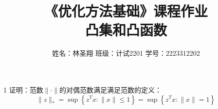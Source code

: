 \documentclass{article}
\newenvironment{problem_cn}[2][问题]{\begin{trivlist}
\item[\hskip \labelsep {\bfseries #1}\hskip \labelsep {\bfseries #2.}]}{\end{trivlist}}
\begin{document}

\title{《优化方法基础》课程作业\\凸集和凸函数}  %
\author{姓名：林圣翔 \quad 班级：计试2201 \quad 学号：2223312202}  %

\maketitle

\begin{problem_cn}{1}
证明：范数$\boldsymbol{\|\cdot\|}$的对偶范数满足满足范数的定义：  
$$\|z\|_* = \sup \left\{ z^T x : \|x\| \leq 1 \right\} = \sup \left \{ z^T x : \|x\| = 1 \right\}$$ 
\end{problem_cn}
\end{document}
